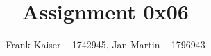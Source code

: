 \documentclass{article}
\begin{document}
	
	\title{Assignment 0x06}
	\author{Frank Kaiser -- 1742945, Jan Martin -- 1796943}
	
	\maketitle
	
	\tableofcontents
	
	
	
	
\end{document}
